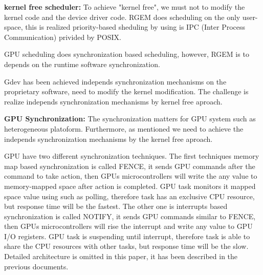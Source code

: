 \fi

\textbf{kernel free scheduler:}
To achieve "kernel free", we must not to modify the kernel code and the device driver code.
RGEM does scheduling on the only user-space, this is realized priority-based sheduling by using is IPC (Inter Process Communication) privided by POSIX.

GPU scheduling does synchronization based scheduling,
however, RGEM is to depends on the runtime software synchronization.

Gdev has been achieved independs synchronization mechanisms on the proprietary software, need to modify the kernel modification.
The challenge is realize independs synchronization mechanisms by kernel free aproach.


\textbf{GPU Synchronization:}
The synchronization matters for GPU system such as heterogeneous platoform.
Furthermore, as mentioned we need to achieve the independs synchronization mechanisms by the kernel free aproach.

GPU have two different synchronization techniques.
The first techniques memory map based synchronization is called FENCE, 
it sends GPU commands after the command to take action, then GPUs microcontrollers will write the any value to memory-mapped space after action is completed.
GPU task monitors it mapped space value using such as polling, therefore task has an exclusive CPU resource, but response time will be the fastest.
The other one is interrupts based synchronization is called NOTIFY,
it sends GPU commands similar to FENCE, then GPUs microcontrollers will rise the interrupt and write any value to GPU I/O registers.
GPU task is suspending until interrupt, therefore task is able to share the CPU resources with other tasks, but response time will be the slow.
Detailed architecture is omitted in this paper, it has been described in the previous documents\cite{kato:timegraph,kato:gdev,fujii:apsys2013}.

